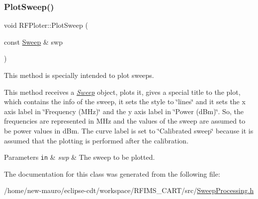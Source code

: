 \subsubsection{\texorpdfstring{Plot\+Sweep()}{PlotSweep()}}
{\footnotesize\ttfamily void R\+F\+Ploter\+::\+Plot\+Sweep (\begin{DoxyParamCaption}\item[{const \hyperlink{structSweep}{Sweep} \&}]{swp }\end{DoxyParamCaption})\hspace{0.3cm}{\ttfamily [inline]}}



This method is specially intended to plot sweeps. 

This method receives a {\itshape \hyperlink{structSweep}{Sweep}} object, plots it, gives a special title to the plot, which contains the info of the sweep, it sets the style to \char`\"{}lines\char`\"{} and it sets the x axis label in \char`\"{}\+Frequency (\+M\+Hz)\char`\"{} and the y axis label in \char`\"{}\+Power (d\+Bm)\char`\"{}. So, the frequencies are represented in M\+Hz and the values of the sweep are assumed to be power values in d\+Bm. The curve label is set to \char`\"{}\+Calibrated sweep\char`\"{} because it is assumed that the plotting is performed after the calibration. 
\begin{DoxyParams}[1]{Parameters}
\mbox{\tt in}  & {\em swp} & The sweep to be plotted. \\
\hline
\end{DoxyParams}


The documentation for this class was generated from the following file\+:\begin{DoxyCompactItemize}
\item 
/home/new-\/mauro/eclipse-\/cdt/workspace/\+R\+F\+I\+M\+S\+\_\+\+C\+A\+R\+T/src/\hyperlink{SweepProcessing_8h}{Sweep\+Processing.\+h}\end{DoxyCompactItemize}
